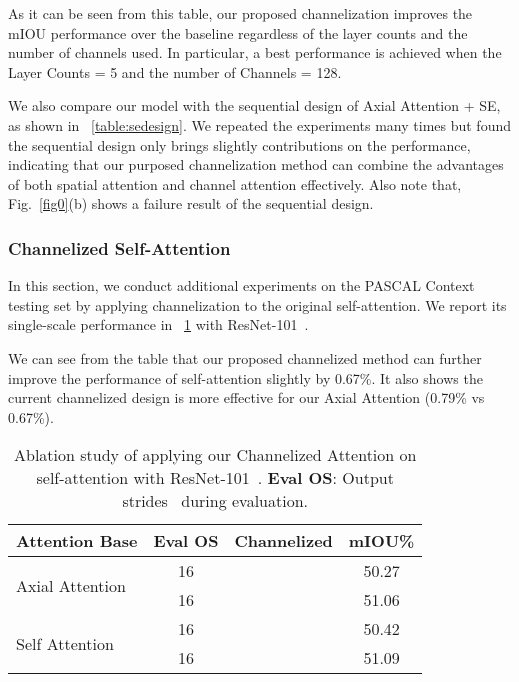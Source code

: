 \documentclass[journal]{IEEEtran}
\begin{document}
As it can be seen from this table, our proposed channelization improves the mIOU performance over the baseline regardless of the layer counts and the number of channels used. 
In particular, a best performance is achieved when the Layer Counts = 5 and the number of Channels = 128. 

We also compare our model with the sequential design of Axial Attention + SE, as shown in \tablename{~\ref{table:sedesign}}. 
We repeated the experiments many times but found the sequential design only brings slightly contributions on the performance, indicating that our purposed channelization method can combine the advantages of both spatial attention and channel attention effectively. 
Also note that, Fig.~\ref{fig0}(b) shows a failure result of the sequential design.\\

\subsubsection{Channelized Self-Attention}
In this section, we conduct additional experiments on the PASCAL Context testing set by applying channelization to the original self-attention. 
We report its single-scale performance in~\tablename{ \ref{tabCSA}} with ResNet-101~\cite{cResnet}. 

We can see from the table that our proposed channelized method can further improve the performance of self-attention slightly by 0.67\%.
It also shows the current channelized design is more effective for our Axial Attention (0.79\% vs 0.67\%). 


\begin{table}[t]
	\centering
\caption{Ablation study of applying our Channelized Attention on self-attention with ResNet-101~\cite{cResnet}. \textbf{Eval OS}: Output strides~\cite{cDeepLabV3Plus} during evaluation.}
	\begin{tabular}{l|c|c|c} 
		\toprule
		Attention Base                    & Eval OS & Channelized     & mIOU\%   \\
		\midrule[0.5pt]
		\midrule[0.5pt]
		\multirow{2}{*}{Axial Attention  }& 16       &             & 50.27  \\
		& 16  	 & \checkmark  & 51.06  \\
		\midrule
		\multirow{2}{*}{  Self Attention} & 16  	 &             & 50.42  \\
		& 16  	 & \checkmark  & 51.09  \\
		\bottomrule[0.5pt]
	\end{tabular}
	 
	\label{tabCSA}
\end{table}
\end{document}
